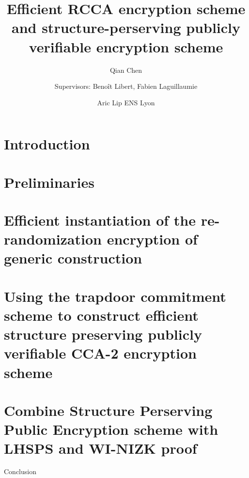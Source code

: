 \documentclass[11pt]{article}
\begin{document}
\title{Efficient RCCA encryption scheme and structure-perserving publicly verifiable encryption scheme}

\author{Qian Chen \and Supervisors: Beno\^it Libert, Fabien Laguillaumie \and Aric Lip ENS Lyon}


\maketitle

\thispagestyle{empty}



\section{Introduction}


\newpage

\section{Preliminaries}



\section{Efficient instantiation of the re-randomization encryption of generic construction~\cite{DBLP:conf/eurocrypt/ChaseKLM12}}


\section{Using the trapdoor commitment scheme to construct efficient structure preserving publicly verifiable CCA-2 encryption scheme}


\section{Combine Structure Perserving Public Encryption scheme with LHSPS and WI-NIZK proof}


\begin{section}{Conclusion}
  
\end{section}

\newpage

\printbibliography
\end{document}
